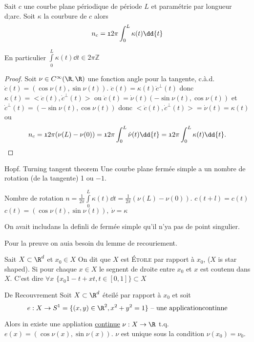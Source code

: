 \begin{theorem}
	Sait $c$ une courbe plane périodique de période $L$ et paramétrie par longueur d;arc. Soit $\kappa$ la courbure de $c$ alors
		$$n_c=\frak{1}{2\pi}\int_0^L\kappa(t)\dd{t}$$
\end{theorem}
\begin{remark}
	En particulier $\int\limits_0^L\kappa(t)\dd{t}\in 2\pi\mathbb{Z}$
\end{remark}
\begin{proof}
	Soit $\nu\in C^\infty(\R, \R)$ une fonction angle pour la tangente, c.à.d.$\dot{c}(t)=(\cos \nu(t), \sin\nu(t))$. $\ddot{c}(t)=\kappa(t)\dot{c}^\perp (t)$ donc $\kappa(t)=<\ddot{c}(t), \dot{c}^\perp (t)>$ ou $\ddot{c}(t)=\dot{\nu}(t)(-\sin\nu(t), \cos\nu(t))$ et $\dot{c}^\perp(t)=(-\sin\nu(t),\cos\nu(t))$
	donc $<\ddot{c}(t), \dot{c}^\perp(t)>=\dot{\nu}(t)=\kappa(t)$ ou
	$$n_c = \frak{1}{2\pi}(\nu(L)-\nu(0))=\frak{1}{2\pi}\int_0^L \dot{\nu}(t)\dd{t}=\frak{1}{2\pi}\int_0^L\kappa(t)\dd{t}.$$
\end{proof}

\begin{theorem}{Hopf. Turning tangent theorem}
	Une courbe plane fermée simple a un nombre de rotation (de la tangente) 1 ou $-1$.
\end{theorem}

Nombre de rotation $n=\frac{1}{2\pi}\int\limits_0^L\kappa(t)\dd{t}=\frac{1}{2\pi}(\nu(L)-\nu(0))$. $c(t+l)=c(t)$ $c(t)=(\cos \nu (t), \sin \nu(t)),\ \dot\nu=\kappa$
\begin{remark}
	On avait includans la definli de fermée simple qu'il n'ya pas de point singulier.
\end{remark}
	
Pour la preuve on auia besoin du lemme de recouriement.

\begin{definition}
	Sait $X\subset \R^d$ et $x_0\in X$ On dit que $X$ est \textsc{Étoile} par rapport à $x_0$, ($X$ is star shaped). Si pour chaque $x\in X$ le segnent de droite entre $x_0$ et $x$ est coutenu dans $X$. C'est dire $\forall x$ $\{x_0{1-t}+xt, t\in[0,1]\}\subset X$
\end{definition}

\begin{lemme}{De Recouvrement}
	Soit $X\subset \R^d$ éteilé par rapport à $x_0$ et soit
	$$e: X\rightarrow S^1=\{(x,y)\in\R^2, x^2+y^2=1\} \text{ -- une applicationcontinne}$$
	
	Alors in existe une appliation \underline{continue} $\nu: X\rightarrow \R$ t.q. $e(x)=(\cos\nu(x), \sin\nu(x))$. $\nu$ est unique sous la condition $\nu(x_0)=\nu_0$.
\end{lemme}

